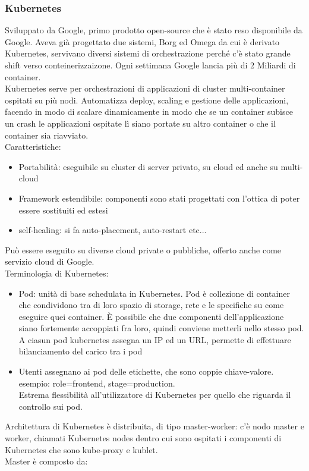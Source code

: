 \documentclass[16px]{article}
\begin{document}
\subsubsection{Kubernetes}
Sviluppato da Google, primo prodotto open-source che è stato reso disponibile da Google. Aveva già progettato due sistemi, Borg ed Omega da cui è derivato Kubernetes, servivano diversi sistemi di orchestrazione perché c'è stato grande shift verso conteinerizzaizone. Ogni settimana Google lancia più di 2 Miliardi di container.\\ Kubernetes serve per orchestrazioni di applicazioni di cluster multi-container ospitati su più nodi. Automatizza deploy, scaling e gestione delle applicazioni, facendo in modo di scalare dinamicamente in modo che se un container subisce un crash le applicazioni ospitate lì siano portate su altro container o che il container sia riavviato.\\ Caratteristiche:
\begin{itemize}
\item Portabilità: eseguibile su cluster di server privato, su cloud ed anche su multi-cloud
\item Framework estendibile: componenti sono stati progettati con l'ottica di poter essere sostituiti ed estesi
\item self-healing: si fa auto-placement, auto-restart etc...
\end{itemize}
Può essere eseguito su diverse cloud private o pubbliche, offerto anche come servizio cloud di Google.\\ Terminologia di Kubernetes:
\begin{itemize}
\item Pod: unità di base schedulata in Kubernetes. Pod è collezione di container che condividono tra di loro spazio di storage, rete e le specifiche su come eseguire quei container. È possibile che due componenti dell'applicazione siano fortemente accoppiati fra loro, quindi conviene metterli nello stesso pod.\\ A ciasun pod kubernetes assegna un IP ed un URL, permette di effettuare bilanciamento del carico tra i pod
\item Utenti assegnano ai pod delle etichette, che sono coppie chiave-valore. esempio: role=frontend, stage=production.\\ Estrema flessibilità all'utilizzatore di Kubernetes per quello che riguarda il controllo sui pod.
\end{itemize}
Architettura di Kubernetes è distribuita, di tipo master-worker: c'è nodo master e worker, chiamati Kubernetes nodes dentro cui sono ospitati i componenti di Kubernetes che sono kube-proxy e kublet.\\ Master è composto da:
\end{document}
